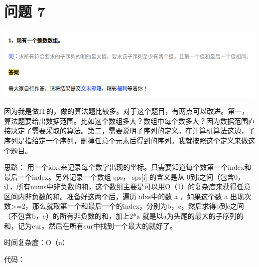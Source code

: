 \documentclass{article}
\begin{document}
\newpage
\section{问题 7}
\includegraphics[scale=0.7]{algo.png}

因为我是做IT的，做的算法题比较多。对于这个题目，有两点可以改进。第一，算法题要给出数据范围。比如这个数组多大？数组中每个数多大？因为数据范围直接决定了需要采取的算法。第二，需要说明子序列的定义。在计算机算法这边，子序列是指给定一个序列，删掉任意个元素后得到的序列。我就按照这个定义来做这个题目。

思路： 用一个idxs来记录每个数字出现的坐标。只需要知道每个数第一个index和最后一个index。另外记录一个数组 sps， sps[i] 的含义是从 0到i之间（包含0，i），所有nums中非负数的和，这个数组主要是可以用O（1）的复杂度来获得任意区间内非负数的和。准备好这两个后，遍历 idxs中的数 a ，如果这个数 a 出现次数>=2，那么就取第一个和最后一个的index，分别为b，e，然后求得b到e之间（不包含b，e）的所有非负数的和，加上2*a 就是以a为头尾的最大的子序列的和，记为cur。然后在所有cur中找到一个最大的就好了。

时间复杂度：O（n）

代码：
\end{document}
